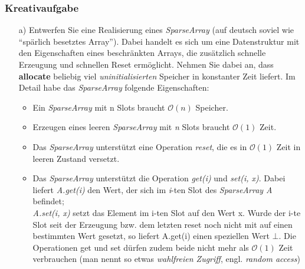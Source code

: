 \begin{frame}
	\frametitle{Kreativaufgabe}

	\begin{itemize}
		\item[a)] Entwerfen Sie eine Realisierung eines \textit{SparseArray} (auf deutsch soviel wie "`spärlich besetztes Array"'). Dabei handelt es sich um eine Datenstruktur mit 
			den Eigenschaften eines beschränkten Arrays, die zusätzlich schnelle Erzeugung und schnellen Reset ermöglicht.
			Nehmen Sie dabei an, dass \textbf{allocate} beliebig viel \textit{uninitialisierten} Speicher in konstanter Zeit liefert. Im Detail habe das \textit{SparseArray} folgende Eigenschaften:
		\begin{itemize}
			\item Ein \textit{SparseArray} mit n Slots braucht $\mathcal{O}(n)$ Speicher.
			\item Erzeugen eines leeren \textit{SparseArray} mit \textit{n} Slots braucht $\mathcal{O}(1)$ Zeit.
			\item Das \textit{SparseArray} unterstützt eine Operation \textit{reset}, die es in $\mathcal{O}(1)$ Zeit in leeren Zustand versetzt.
			\item Das \textit{SparseArray} unterstützt die Operation \textit{get(i)} und \textit{set(i, x)}. Dabei liefert \textit{A.get(i)} den Wert, der sich im \textit{i}-ten Slot des \textit{SparseArray A} befindet;\\
				\textit{A.set(i, x)} setzt das Element im i-ten Slot auf den Wert x. Wurde der i-te Slot seit der Erzeugung bzw. dem letzten reset noch nicht mit auf einen 
				bestimmten Wert gesetzt, so liefert A.get(i) einen speziellen Wert $\bot$. Die Operationen get und set dürfen zudem beide nicht mehr als $\mathcal{O}(1)$ Zeit verbrauchen (man nennt so etwas \textit{wahlfreien 	
				Zugriff}, engl. \textit{random access})
		\end{itemize}
	\end{itemize}

\end{frame}

